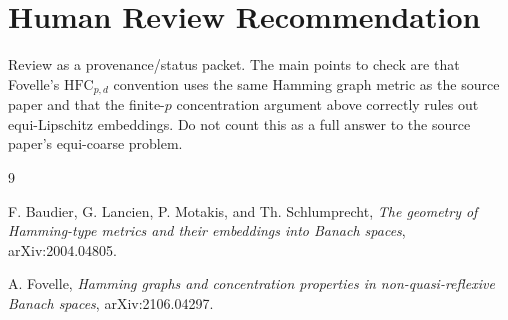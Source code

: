 \documentclass[11pt]{article}
\newcommand{\HFC}{\mathrm{HFC}}
\begin{document}
\section*{Human Review Recommendation}

Review as a provenance/status packet. The main points to check are that
Fovelle's $\HFC_{p,d}$ convention uses the same Hamming graph metric as the
source paper and that the finite-$p$ concentration argument above correctly
rules out equi-Lipschitz embeddings. Do not count this as a full answer to the
source paper's equi-coarse problem.

\begin{thebibliography}{9}

F. Baudier, G. Lancien, P. Motakis, and Th. Schlumprecht,
\emph{The geometry of Hamming-type metrics and their embeddings into Banach
spaces},
arXiv:2004.04805.

A. Fovelle,
\emph{Hamming graphs and concentration properties in non-quasi-reflexive
Banach spaces},
arXiv:2106.04297.

\end{thebibliography}
\end{document}
